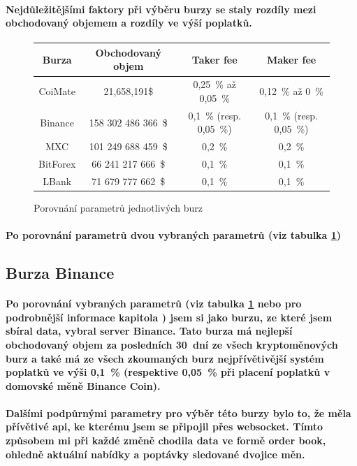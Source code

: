 \documentclass[thesis=B,czech]{FITthesis}[2019/03/21]
\begin{document}
\paragraph{
Nejdůležitějšími faktory při výběru burzy se staly rozdíly mezi obchodovaný objemem a rozdíly ve výší poplatků.
}
\begin{figure}\centering
    \begin{center}
     \begin{tabular}{||c | c | c | c||} 
     \hline
     Burza & Obchodovaný objem & Taker fee & Maker fee \\ [0.5ex]
     \hline\hline
     CoiMate & 21,658,191\$ & 0,25~\% až 0,05~\% & 0,12~\% až 0~\%  \\ 
     \hline
     Binance & 158 302 486 366~\$ & 0,1~\% (resp. 0,05~\%) & 0,1~\% (resp. 0,05~\%)  \\ 
     \hline
     MXC & 101 249 688 459~\$ & 0,2~\% & 0,2~\%  \\ 
     \hline
     BitForex & 66 241 217 666~\$ & 0,1~\% & 0,1~\%  \\ 
     \hline
     LBank & 71 679 777 662~\$ & 0,1~\% & 0,1~\%  \\ 
     \hline
    \end{tabular}
    \end{center}
    \caption{Porovnání parametrů jednotlivých burz}
    \label{exchanges_comparison}
\end{figure}
\paragraph{
Po porovnání parametrů dvou vybraných parametrů (viz tabulka \ref{exchanges_comparison})
}
\subsection{Burza Binance}
\paragraph{
Po porovnání vybraných parametrů (viz tabulka \ref{exchanges_comparison} nebo pro podrobnější informace kapitola ) jsem si jako burzu, ze které jsem sbíral data, vybral server Binance. Tato burza má nejlepší obchodovaný objem za posledních 30~dní ze všech kryptoměnových burz \cite{coinmarketcap} a také má ze všech zkoumaných burz nejpřívětivější systém poplatků ve výši 0,1~\% (respektive 0,05~\% při placení poplatků v domovské měně Binance Coin).
}
\paragraph{
Dalšími podpůrnými parametry pro výběr této burzy bylo to, že měla přívětivé api, ke kterému jsem se připojil přes websocket. \cite{BinanceApi} Tímto způsobem mi při každé změně chodila data ve formě order book, ohledně aktuální nabídky a poptávky sledované dvojice měn. \cite{BinanceApi}
}
\end{document}
